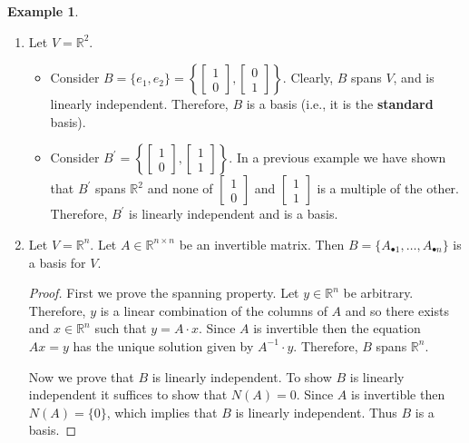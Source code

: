\documentclass[12pt]{article}
\theoremstyle{definition}
\newtheorem*{example}{Example}
\begin{document}
\begin{example}
\begin{enumerate}[label = (\arabic*)]
\item Let $V = \mathbb{R}^2$.
\begin{itemize}
\item [] Consider $B = \{e_1, e_2 \} = \left\{ \begin{bmatrix} 1 \\ 0 \end{bmatrix},
\begin{bmatrix} 0 \\ 1 \end{bmatrix} \right\}.$ Clearly, $B$ spans $V$, and is
linearly independent. Therefore, $B$ is a basis (i.e., it is the \textbf{standard} basis).

\item Consider $B^{\prime} = \left\{ \begin{bmatrix} 1 \\ 0 \end{bmatrix}, 
\begin{bmatrix} 1 \\ 1 \end{bmatrix} \right\}$. In a previous example we have shown
that $B^{\prime}$ spans $\mathbb{R}^2$ and none of $\begin{bmatrix} 1 \\ 0 \end{bmatrix}$ and
$\begin{bmatrix} 1 \\ 1 \end{bmatrix}$ is a multiple of the other. Therefore, $B^{\prime}$ is
linearly independent and is a basis.
\end{itemize}

\item Let $V = \mathbb{R}^n$. Let $A \in \mathbb{R}^{n \times n}$ be an invertible matrix. Then
$B = \{A_{\bullet 1}, \ldots, A_{\bullet n} \}$ is a basis for $V$.

\begin{proof}
First we prove the spanning property. Let $y \in \mathbb{R}^n$ be arbitrary. Therefore, $y$
is a linear combination of the columns of $A$ and so there exists and $x \in \mathbb{R}^n$
such that $y = A \cdot x$. Since $A$ is invertible then the equation $Ax = y$ has the unique
solution given by $A^{-1} \cdot y$. Therefore, $B$ spans $\mathbb{R}^n$.

Now we prove that $B$ is linearly independent. To show $B$ is linearly independent it suffices to
show that $N(A) = 0$. Since $A$ is invertible then $N(A) = \{ 0 \}$, which implies that
$B$ is linearly independent. Thus $B$ is a basis.
\end{proof}


\end{enumerate}
\end{example}
\end{document}
